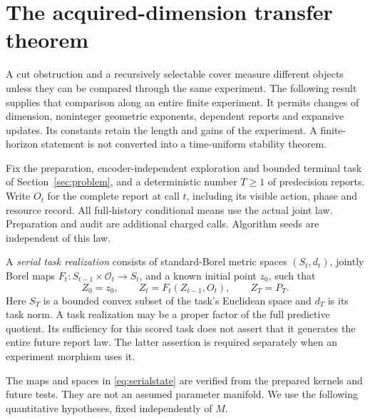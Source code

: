 \section{The acquired-dimension transfer theorem}\label{sec:serial}
A cut obstruction and a recursively selectable cover measure different objects unless they can be compared through the same experiment. The following result supplies that comparison along an entire finite experiment. It permits changes of dimension, noninteger geometric exponents, dependent reports and expansive updates. Its constants retain the length and gains of the experiment. A finite-horizon statement is not converted into a time-uniform stability theorem.

Fix the preparation, encoder-independent exploration and bounded terminal task of Section~\ref{sec:problem}, and a deterministic number $T\ge1$ of predecision reports. Write $O_t$ for the complete report at call $t$, including its visible action, phase and resource record. All full-history conditional means use the actual joint law. Preparation and audit are additional charged calls. Algorithm seeds are independent of this law.

A \emph{serial task realization} consists of standard-Borel metric spaces $(S_t,d_t)$, jointly Borel maps $F_t:S_{t-1}\times\mathcal O_t\to S_t$, and a known initial point $z_0$, such that
\begin{equation}\label{eq:serialstate}
 Z_0=z_0,\qquad Z_t=F_t(Z_{t-1},O_t),\qquad Z_T=P_T.
\end{equation}
Here $S_T$ is a bounded convex subset of the task's Euclidean space and $d_T$ is its task norm. A task realization may be a proper factor of the full predictive quotient. Its sufficiency for this scored task does not assert that it generates the entire future report law. The latter assertion is required separately when an experiment morphism uses it.

The maps and spaces in \eqref{eq:serialstate} are verified from the prepared kernels and future tests. They are not an assumed parameter manifold. We use the following quantitative hypotheses, fixed independently of $M$.

